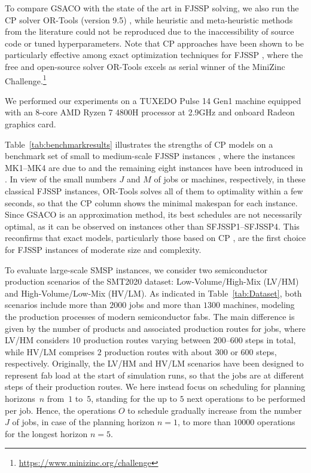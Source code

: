 \documentclass[runningheads]{llncs}
\begin{document}
To compare GSACO with the state of the art in FJSSP solving,
we also run the CP solver OR-Tools (version 9.5) \cite{pediga23a},
while heuristic and meta-heuristic methods from the literature could not
be reproduced due to the inaccessibility of source code or tuned hyperparameters.
Note that CP approaches have been shown to be particularly effective among
exact optimization techniques for FJSSP \cite{kubec16a},
where the free and open-source solver OR-Tools excels
as serial winner of the Mi\-ni\-Zinc Challenge.\footnote{\url{https://www.minizinc.org/challenge}}

We performed our experiments on a TUXEDO Pulse 14 Gen1 machine
equipped with an 8-core AMD Ryzen 7 4800H processor at 2.9GHz and onboard
Radeon graphics card.


Table~\ref{tab:benchmarkresults} illustrates the strengths of CP models on a benchmark set of
small to medium-scale FJSSP instances \cite{arnaout2014two},
where the instances MK1--MK4 are due to 
\cite{brandimarte1993routing} and the remaining eight instances
have been introduced in
\cite{fattahi2007mathematical}.
In view of the small numbers $J$ and $M$ of jobs or machines, respectively,
in these classical FJSSP instances,
OR-Tools solves all of them to optimality within a few seconds,
so that the CP column shows the minimal makespan for each instance.
Since GSACO is an approximation method, its best schedules are not
necessarily optimal, as it can be observed on instances other than
SFJSSP1--SFJSSP4.
This reconfirms that exact models,
particularly those based on CP \cite{kubec16a},
are the first choice for FJSSP instances
of moderate size and complexity.%
%

To evaluate large-scale SMSP instances,
we consider two semiconductor production scenarios of the SMT2020 dataset:
Low-Volume/High-Mix (LV/HM) and High-Volume/Low-Mix (HV/LM).
As indicated in Table~\ref{tab:Dataset},
both scenarios include more than $2000$ jobs and more than $1300$ machines,
modeling the production processes of modern semiconductor fabs.
The main difference is given by the number of products and associated production routes for jobs, where LV/HM considers $10$ production routes varying between
$200$--$600$ steps in total, while HV/LM comprises $2$ production routes with about
$300$ or $600$ steps, respectively.
Originally, the LV/HM and HV/LM scenarios have been designed to represent fab load at the
start of simulation runs, so that the jobs are at different steps of their
production routes.
We here instead focus on scheduling for planning horizons~$n$ from~$1$ to~$5$,
standing for the up to $5$ next operations to be performed per job.
Hence, the operations $O$ to schedule gradually increase from the
number $J$ of jobs, in case of the planning horizon $n=1$,
to more than $10000$ operations %
for the longest %
horizon $n=5$.
\end{document}
